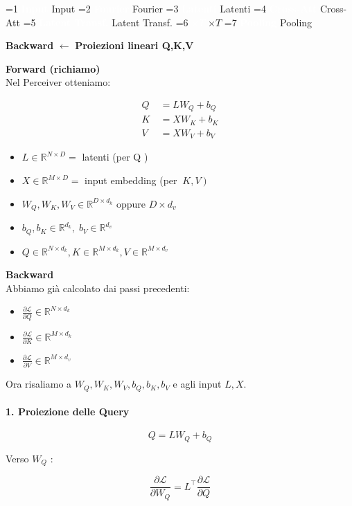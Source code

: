 \documentclass[
  11pt,
]{article}
\newcommand{\currentstep}[1]{%
\begin{tcolorbox}[colback=red!3, colframe=red!40!black, boxrule=0.3pt, arc=2pt,
  left=4pt, right=4pt, top=2pt, bottom=2pt]
{\footnotesize\textbf{Backward} $\longleftarrow$ \textbf{#1}}
\end{tcolorbox}}
\newcommand{\mystripchip}[3]{%
  \setlength{\fboxsep}{2.8pt}%
  \ifnum#3=#1\relax
    \colorbox{seccolor}{\textcolor{white}{\bfseries #2}}%
  \else
    \colorbox{seccolor!8}{\textcolor{seccolor!55}{#2}}%
  \fi}
\newcommand{\mystriparr}{{\fontsize{8}{8}\selectfont\;\textcolor{seccolor!45}{$\rightarrow$}\;}}
\newcommand{\mystrip}[1]{%
\begin{center}
{\sffamily\fontsize{7.5}{9}\selectfont
\mystripchip{1}{Input}{#1}\mystriparr\mystripchip{2}{Fourier}{#1}\mystriparr\mystripchip{3}{Latenti}{#1}\mystriparr%
\mystripchip{4}{Cross-Att}{#1}\mystriparr\mystripchip{5}{Latent Transf.}{#1}\mystriparr%
\mystripchip{6}{$\times T$}{#1}\mystriparr\mystripchip{7}{Pooling}{#1}}
\end{center}}
\renewcommand{\currentstep}[2][0]{%
\mystrip{#1}%
\begin{tcolorbox}[colback=red!3, colframe=red!40!black, boxrule=0.3pt, arc=2pt,
  left=4pt, right=4pt, top=2pt, bottom=2pt]
{\footnotesize\textbf{Backward} $\longleftarrow$ \textbf{#2}}
\end{tcolorbox}}
\begin{document}
\currentstep[5]{Proiezioni lineari Q,K,V}

\textbf{Forward (richiamo)}\\
Nel Perceiver otteniamo:

\[\begin{matrix}
Q & \  = LW_{Q} + b_{Q} \\
K & \  = XW_{K} + b_{K} \\
V & \  = XW_{V} + b_{V}
\end{matrix}\]

\begin{itemize}
\item
  \(L \in \mathbb{R}^{N \times D} =\) latenti (per Q )
\item
  \(X \in \mathbb{R}^{M \times D} =\) input embedding (per
  \(\left. \ K,V \right)\)
\item
  \(W_{Q},W_{K},W_{V} \in \mathbb{R}^{D \times d_{k}}\) oppure
  \(D \times d_{v}\)
\item
  \(b_{Q},b_{K} \in \mathbb{R}^{d_{k}},\; b_{V} \in \mathbb{R}^{d_{v}}\)
\item
  \(Q \in \mathbb{R}^{N \times d_{k}},K \in \mathbb{R}^{M \times d_{k}},V \in \mathbb{R}^{M \times d_{v}}\)
\end{itemize}

\textbf{Backward}\\
Abbiamo già calcolato dai passi precedenti:

\begin{itemize}
\item
  \(\frac{\partial\mathcal{L}}{\partial Q} \in \mathbb{R}^{N \times d_{k}}\)
\item
  \(\frac{\partial\mathcal{L}}{\partial K} \in \mathbb{R}^{M \times d_{k}}\)
\item
  \(\frac{\partial\mathcal{L}}{\partial V} \in \mathbb{R}^{M \times d_{v}}\)
\end{itemize}

Ora risaliamo a \(W_{Q},W_{K},W_{V},b_{Q},b_{K},b_{V}\) e agli input
\(L,X\).

\paragraph{1. Proiezione delle Query}

\[Q = LW_{Q} + b_{Q}\]

Verso \(W_{Q}\) :

\[\frac{\partial\mathcal{L}}{\partial W_{Q}} = L^{\top}\frac{\partial\mathcal{L}}{\partial Q}\]
\end{document}
